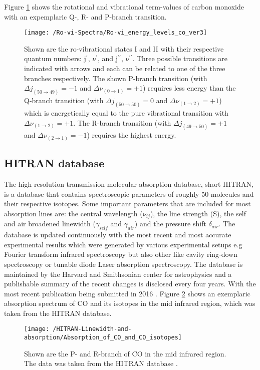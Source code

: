 Figure \ref{Figure:ro-vi-spectrum} shows the rotational and vibrational term-values of carbon monoxide with an expemplaric Q-, R- and P-branch transition.
\begin{figure}[H]
	\centering
	\texttt{[image: /Ro-vi-Spectra/Ro-vi\_energy\_levels\_co\_ver3]}
	\caption{Shown are the ro-vibrational states I and II with their respective quantum numbers: j$^{\prime}$, $\nu^{\prime}$, and j$^{\prime \prime}$, $\nu^{\prime \prime}$. Three possible transitions are indicated with arrows and each can be related to one of the three branches respectively. The shown P-branch transition (with $\Delta j_{(50 \rightarrow 49)}=-1$ and $\Delta \nu_{(0 \rightarrow 1)}=+1$)  requires less energy than the Q-branch transition (with $\Delta j_{(50 \rightarrow 50)}=0$ and $\Delta \nu_{(1 \rightarrow 2)}=+1$) which is energetically equal to the pure vibrational transition with $\Delta \nu_{(1 \rightarrow 2)}=+1$. The R-branch transition (with $\Delta j_{(49 \rightarrow 50)}=+1$ and $\Delta \nu_{(2 \rightarrow 1)}=-1$) requires the highest energy. }
	\label{Figure:ro-vi-spectrum}
\end{figure}
\subsection{HITRAN database}
The high-resolution transmission molecular absorption database, short HITRAN, is a database that contains spectroscopic parameters of roughly 50 molecules and their respective isotopes. Some important parameters that are included for most absorption lines are: the central wavelength ($\nu_{ij}$), the line strength (S), the self and air broadened linewidth ($\gamma_{self}$ and  $\gamma_{air}$) and the pressure shift $\delta_{air}$. The database is updated continuously with the most recent and most accurate experimental results which were generated by various experimental setups e.g Fourier transform infrared spectroscopy but also other like cavity ring-down spectroscopy or tunable diode Laser absorption spectroscopy. The database is maintained by the Harvard and Smithsonian center for astrophysics and a publishable summary of the recent changes is disclosed every four years. With the most recent publication being submitted in 2016 \cite{Hitran2016}. Figure \ref{CO2_Absorbtion_HITRAN} shows an exemplaric absorption spectrum of CO and its isotopes in the mid infrared region, which was taken from the HITRAN database.
\begin{figure}[H]
	\centering
	\texttt{[image: /HITRAN-Linewidth-and-absorption/Absorption\_of\_CO\_and\_CO\_isotopes]}
	\caption{Shown are the P- and R-branch of CO in the mid infrared region. The data was taken from the HITRAN database \cite{Hitran2012} \cite{Hitran2016}.}
	\label{CO2_Absorbtion_HITRAN}
\end{figure}
